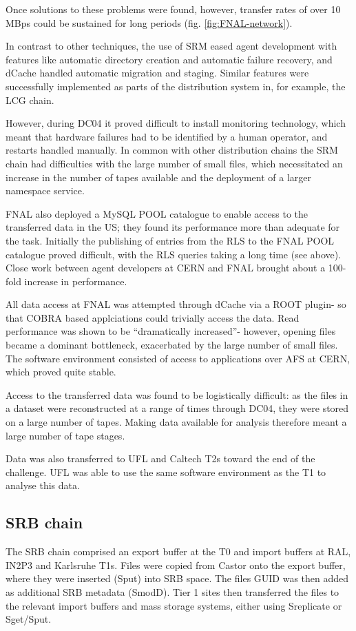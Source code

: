 \documentclass{cmspaper}
\begin{document}
Once solutions to these problems were found, however, transfer rates
of over 10 MBps could be sustained for long periods
(fig. \ref{fig:FNAL-network}).

In contrast to other techniques, the use of SRM eased agent
development with features like automatic directory creation and
automatic failure recovery, and dCache handled automatic migration and
staging. Similar features were successfully implemented as parts of
the distribution system in, for example, the LCG chain.

However, during DC04 it proved difficult to install monitoring
technology, which meant that hardware failures had to be identified by
a human operator, and restarts handled manually. In common with other
distribution chains the SRM chain had difficulties with the large
number of small files, which necessitated an increase in the number of
tapes available and the deployment of a larger namespace service.

FNAL also deployed a MySQL POOL catalogue to enable access to the
transferred data in the US; they found its performance more than
adequate for the task. Initially the publishing of entries from the
RLS to the FNAL POOL catalogue proved difficult, with the RLS queries
taking a long time (see above). Close work between agent developers at
CERN and FNAL brought about a 100-fold increase in performance.

All data access at FNAL was attempted through dCache via a ROOT
plugin- so that COBRA based applciations could trivially access the
data. Read performance was shown to be ``dramatically increased''-
however, opening files became a dominant bottleneck, exacerbated by
the large number of small files. The software environment consisted of
access to applications over AFS at CERN, which proved quite stable.

Access to the transferred data was found to be logistically difficult:
as the files in a dataset were reconstructed at a range of times
through DC04, they were stored on a large number of tapes. Making data
available for analysis therefore meant a large number of tape stages.

Data was also transferred to UFL and Caltech T2s toward the end of the
challenge. UFL was able to use the same software environment as the T1
to analyse this data.

\subsection{SRB chain}
The SRB chain comprised an export buffer at the T0 and import buffers
at RAL, IN2P3 and Karlsruhe T1s. Files were copied from Castor onto
the export buffer, where they were inserted (Sput) into SRB space. The
files GUID was then added as additional SRB metadata (SmodD). Tier 1 sites then
transferred the files to the relevant import buffers and mass storage
systems, either using Sreplicate or Sget/Sput.
\end{document}
